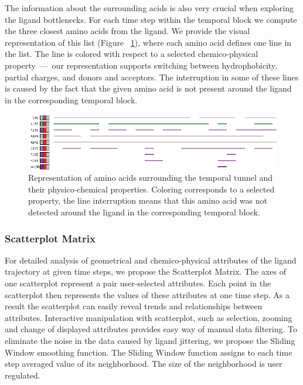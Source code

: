 \documentclass[twocolumn]{bmcart}%
\begin{document}
The information about the surrounding acids is also very crucial when exploring the ligand bottlenecks. 
For each time step within the temporal block we compute the three closest amino acids from the ligand. 
We provide the visual representation of this list (Figure ~\ref{fig:aacids}), where each amino acid defines one line in the list. 
The line is colored with respect to a selected chemico-physical property~---~our representation supports switching between hydrophobicity, partial charges, and donors and acceptors.
The interruption in some of these lines is caused by the fact that the given amino acid is not present around the ligand in the corresponding temporal block.

\begin{figure}[htb]
	\centering
  \includegraphics[width=0.95\linewidth]{img/aacids.png}
  \caption{\label{fig:aacids} Representation of amino acids surrounding the temporal tunnel and their physico-chemical properties. Coloring corresponds to a selected property, the line interruption means that this amino acid was not detected around the ligand in the corresponding temporal block.}
\end{figure}


\subsubsection*{Scatterplot Matrix}
For detailed analysis of geometrical and chemico-physical attributes of the ligand trajectory at given time steps, we propose the Scatterplot Matrix.
The axes of one scatterplot represent a pair user-selected attributes.
Each point in the scatterplot then represents the values of these attributes at one time step.
As a result the scatterplot can easily reveal trends and relationships between attributes.
Interactive manipulation with scatterplot, such as selection, zooming and change of displayed attributes provides easy way of manual data filtering. 
To eliminate the noise in the data caused by ligand jittering, we propose the Sliding Window smoothing function.
The Sliding Window function assigns to each time step averaged value of its neighborhood.
The size of the neighborhood is user regulated. 
\end{document}

